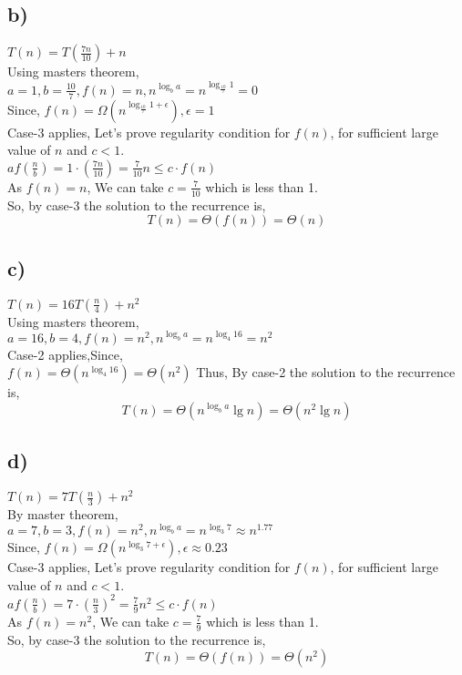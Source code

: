 \documentclass[a4paper, 11pt]{article}
\begin{document}
\subsection*{b)}
$T(n) = T(\frac{7n}{10}) + n$\\
Using masters theorem,\\
$a=1, b=\frac{10}{7}, f(n) = n, n^{\log_{b}a}=n^{\log_{\frac{10}{7}}1}=0$\\
Since, $f(n) = \Omega(n^{\log_{\frac{10}{7}}1 + \epsilon}), \epsilon=1$\\
Case-3 applies, Let's prove regularity condition for $f(n)$, for sufficient large value of $n$ and $c<1$.\\
$af(\frac{n}{b}) = 1 \cdot(\frac{7n}{10}) = \frac{7}{10}n \le c \cdot f(n)$\\
As $f(n)=n$, We can take $c=\frac{7}{10}$ which is less than 1.\\
So, by case-3 the solution to the recurrence is,
$$T(n) = \Theta (f(n)) = \Theta(n)$$

\subsection*{c)}
$T(n) = 16T(\frac{n}{4}) + n^2$\\
Using masters theorem,\\
$a=16, b=4, f(n) = n^2, n^{\log_{b}a}=n^{\log_{4}16}=n^2$\\
Case-2 applies,Since,\\
$f(n)=\Theta(n^{\log_{4}16}) =\Theta(n^2)$
Thus, By case-2 the solution to the recurrence is,
$$T(n) = \Theta (n^{\log_{b}a} \lg n) = \Theta(n^2 \lg n)$$

\subsection*{d)}
$T(n) =7 T(\frac{n}{3}) + n^2$\\
By master theorem,\\
$a=7, b=3, f(n) = n^2, n^{\log_{b}a}=n^{\log_{3}7} \approx n^{1.77}$\\
Since, $f(n)= \Omega(n^{\log_{3}7 + \epsilon}), \epsilon \approx 0.23$\\
Case-3 applies, Let's prove regularity condition for $f(n)$, for sufficient large value of $n$ and $c<1$.\\
$af(\frac{n}{b}) = 7\cdot(\frac{n}{3})^2 = \frac{7}{9}n^2 \le c \cdot f(n)$\\
As $f(n)=n^2$, We can take $c=\frac{7}{9}$ which is less than 1.\\
So, by case-3 the solution to the recurrence is,
$$T(n) = \Theta (f(n)) = \Theta(n^2)$$
\end{document}
